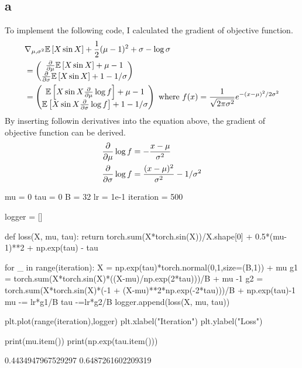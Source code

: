 \documentclass[10pt]{article}
\begin{document}
\subsection*{a}
To implement the following code, I calculated the gradient of objective function. 
\begin{align*}
    &\nabla_{\mu, \sigma^2} \mathbb{E}\left[X \sin X\right] + \frac{1}{2}(\mu - 1)^2 + \sigma - \log \sigma \\
    &= \begin{pmatrix}
        {\partial \over \partial \mu} \mathbb{E}\left[X \sin X\right]  + \mu -1 \\
        {\partial \over \partial \sigma} \mathbb{E}\left[X \sin X\right]  + 1  - 1/\sigma
    \end{pmatrix} \\
    &=  \begin{pmatrix}
        \mathbb{E}\left[X \sin X {\partial \over \partial \mu } \log f \right]  + \mu -1 \\
       \mathbb{E}\left[X \sin X  {\partial \over \partial \sigma} \log f \right]  + 1  - 1/\sigma 
    \end{pmatrix} \text{ where } f(x) = \frac{1}{\sqrt{2\pi \sigma^2}}e^{-(x-\mu)^2/2\sigma^2} 
\end{align*}
By inserting followin derivatives into the equation above, the gradient of objective function can be derived.
\begin{align*}
    {\partial \over \partial \mu } \log f &= -\frac{x-\mu}{\sigma^2}\\
    {\partial \over \partial \sigma } \log f &= \frac{(x-\mu)^2}{\sigma^2} - 1/\sigma^2
\end{align*}
\begin{python}
mu = 0
tau = 0
B = 32
lr = 1e-1
iteration = 500

logger = []

def loss(X, mu, tau):
    return torch.sum(X*torch.sin(X))/X.shape[0] + 0.5*(mu-1)**2 + np.exp(tau) - tau

for _ in range(iteration):
    X = np.exp(tau)*torch.normal(0,1,size=(B,1)) + mu
    g1 = torch.sum(X*torch.sin(X)*((X-mu)/np.exp(2*tau)))/B + mu -1
    g2 = torch.sum(X*torch.sin(X)*(-1 + (X-mu)**2*np.exp(-2*tau)))/B + np.exp(tau)-1
    mu -= lr*g1/B
    tau -=lr*g2/B
    logger.append(loss(X, mu, tau))

plt.plot(range(iteration),logger)
plt.xlabel("Iteration")
plt.ylabel("Loss")

print(mu.item())
print(np.exp(tau.item()))

\end{python}
\begin{python}
0.4434947967529297
0.6487261602209319
\end{python}
\end{document}
